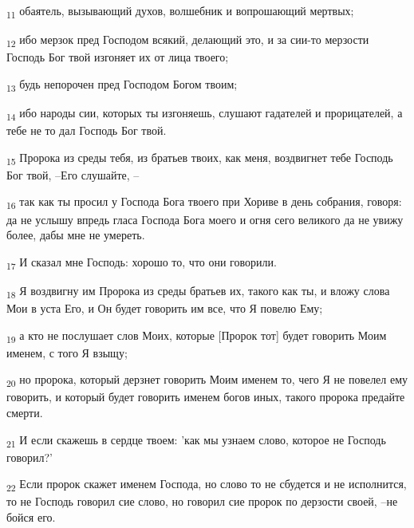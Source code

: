 \begin{tcolorbox}
\textsubscript{11} обаятель, вызывающий духов, волшебник и вопрошающий мертвых;
\end{tcolorbox}
\begin{tcolorbox}
\textsubscript{12} ибо мерзок пред Господом всякий, делающий это, и за сии-то мерзости Господь Бог твой изгоняет их от лица твоего;
\end{tcolorbox}
\begin{tcolorbox}
\textsubscript{13} будь непорочен пред Господом Богом твоим;
\end{tcolorbox}
\begin{tcolorbox}
\textsubscript{14} ибо народы сии, которых ты изгоняешь, слушают гадателей и прорицателей, а тебе не то дал Господь Бог твой.
\end{tcolorbox}
\begin{tcolorbox}
\textsubscript{15} Пророка из среды тебя, из братьев твоих, как меня, воздвигнет тебе Господь Бог твой, --Его слушайте, --
\end{tcolorbox}
\begin{tcolorbox}
\textsubscript{16} так как ты просил у Господа Бога твоего при Хориве в день собрания, говоря: да не услышу впредь гласа Господа Бога моего и огня сего великого да не увижу более, дабы мне не умереть.
\end{tcolorbox}
\begin{tcolorbox}
\textsubscript{17} И сказал мне Господь: хорошо то, что они говорили.
\end{tcolorbox}
\begin{tcolorbox}
\textsubscript{18} Я воздвигну им Пророка из среды братьев их, такого как ты, и вложу слова Мои в уста Его, и Он будет говорить им все, что Я повелю Ему;
\end{tcolorbox}
\begin{tcolorbox}
\textsubscript{19} а кто не послушает слов Моих, которые [Пророк тот] будет говорить Моим именем, с того Я взыщу;
\end{tcolorbox}
\begin{tcolorbox}
\textsubscript{20} но пророка, который дерзнет говорить Моим именем то, чего Я не повелел ему говорить, и который будет говорить именем богов иных, такого пророка предайте смерти.
\end{tcolorbox}
\begin{tcolorbox}
\textsubscript{21} И если скажешь в сердце твоем: 'как мы узнаем слово, которое не Господь говорил?'
\end{tcolorbox}
\begin{tcolorbox}
\textsubscript{22} Если пророк скажет именем Господа, но слово то не сбудется и не исполнится, то не Господь говорил сие слово, но говорил сие пророк по дерзости своей, --не бойся его.
\end{tcolorbox}
